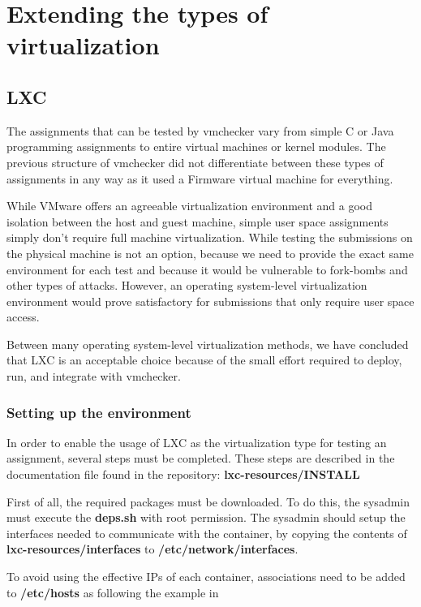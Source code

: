 \chapter{Extending the types of virtualization}
\label{chapter:virt-types}

\section{LXC}
\label{sec:vmc-lxc}

The assignments that can be tested by vmchecker vary from simple C or Java
programming assignments to entire virtual machines or kernel modules.
The previous structure of vmchecker did not differentiate between these types of
assignments in any way as it used a Firmware virtual machine for everything.

While VMware offers an agreeable virtualization environment and a good isolation
between the host and guest machine, simple user space assignments simply don't 
require full machine virtualization. While testing the submissions on the 
physical machine is not an option, because we need to provide the exact same
environment for each test and because it would be vulnerable to fork-bombs and 
other types of attacks. However, an operating system-level virtualization 
environment would prove satisfactory for submissions that only require user space
access.

Between many operating system-level virtualization methods, we have concluded
that LXC is an acceptable choice because of the small effort required to 
deploy, run, and integrate with vmchecker.


\subsection {Setting up the environment}
\label{sub-sec:vmc-lxc-env}

In order to enable the usage of LXC as the virtualization type for testing an 
assignment, several steps must be completed. These steps are described in the 
documentation file found in the repository: \textbf{lxc-resources/INSTALL}

First of all, the required packages must be downloaded. To do this, the sysadmin
must  execute the \textbf{deps.sh} with root permission. The sysadmin should
setup the interfaces needed to communicate with the container, by copying the
contents of \textbf{lxc-resources/interfaces} to \textbf{/etc/network/interfaces}.

To avoid using the effective IPs of each container, associations need to be 
added to \textbf{/etc/hosts} as following the example in 


